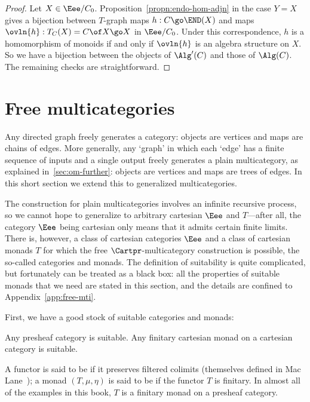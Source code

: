 \begin{proof}
Let $X \in \Eee/C_0$.  Proposition~\ref{propn:endo-hom-adjn} in the case
$Y=X$ gives a bijection between $T$-graph maps $h: C \go \END(X)$ and maps
$\ovln{h}: T_C(X) = C\of X \go X$ in $\Eee/C_0$.  Under this
correspondence, $h$ is a homomorphism of monoids if and only if $\ovln{h}$
is an algebra structure on $X$.  So we have a bijection between the objects
of $\Alg'(C)$ and those of $\Alg(C)$.  The remaining checks are
straightforward.  
\done
\end{proof}%
%
%
%
%








\section{Free multicategories}
%
%
%


Any directed graph freely generates a category: objects are vertices and
maps are chains of edges.  More generally, any `graph' in which each `edge'
has a finite sequence of inputs and a single output freely generates a
plain multicategory, as explained in~\ref{sec:om-further}: objects are
vertices and maps are trees of edges.  In this short section we extend this
to generalized multicategories.

The construction for plain multicategories involves an infinite recursive
process, so we cannot hope to generalize to arbitrary cartesian $\Eee$ and
$T$---after all, the category $\Eee$ being cartesian only means that it
admits certain finite limits.  There is, however, a class of cartesian
categories $\Eee$ and a class of cartesian monads $T$ for which the free
$\Cartpr$-multicategory construction is possible, the so-called
%
%
%
%
%
%
%
categories and monads.  The definition of suitability is
quite complicated, but fortunately can be treated as a black box: all the
properties of suitable monads that we need are stated in this section, and
the details are confined to Appendix~\ref{app:free-mti}.

First, we have a good stock of suitable categories and monads:
%
\begin{thm}	
Any presheaf category is suitable.  Any finitary cartesian monad on a
cartesian category is suitable.
\end{thm}
%
A functor is said to be %
%
%
%
%
%
if it preserves filtered colimits%
%
%
(themselves defined in Mac Lane~\cite[IX.1]{MacCWM}); a monad $(T, \mu,
\eta)$ is said to be %
%
%
if the functor $T$ is finitary.
In almost all of the examples in this book, $T$ is a finitary monad on a
presheaf category.

